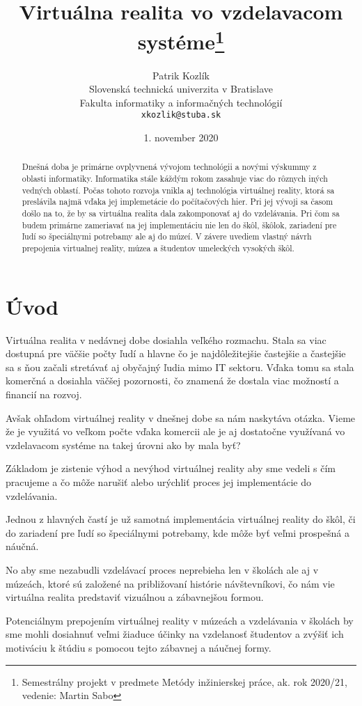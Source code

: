 \documentclass[10pt,twoside,slovak,a4paper]{article}
\title{Virtuálna realita vo vzdelavacom systéme\thanks{Semestrálny projekt v predmete Metódy inžinierskej práce, ak. rok 2020/21, vedenie: Martin Sabo}} %
\author{Patrik Kozlík\\[2pt]
	{\small Slovenská technická univerzita v Bratislave}\\
	{\small Fakulta informatiky a informačných technológií}\\
	{\small \texttt{xkozlik@stuba.sk}}
	}
\date{\small 1. november 2020} %
\begin{document}
\maketitle

\begin{abstract}
Dnešná doba je primárne ovplyvnená vývojom technológii a novými výskummy z oblasti informatiky. Informatika stále káždým rokom zasahuje
viac do rôznych iných vedných oblastí. Počas tohoto rozvoja vnikla aj technológia virtuálnej reality, ktorá sa preslávila najmä vďaka jej
implemetácie do počítačových hier. Pri jej vývoji sa časom došlo na to, že by sa virtuálna realita dala zakomponovať aj do vzdelávania. 
Pri čom sa budem primárne zameriavať na jej implementáciu nie len do škôl, škôlok, zariadení pre ľudí so špeciálnymi potrebamy ale aj do múzeí. V závere uvediem vlastný návrh prepojenia virtualnej reality, múzea a študentov umeleckých vysokých škôl.   	
\end{abstract}



\section{Úvod}

Virtuálna realita v nedávnej dobe dosiahla veľkého rozmachu. Stala sa viac dostupná pre väčšie počty ľudí a hlavne čo je najdôležitejšie 
častejšie a častejšie sa s ňou začali stretávať aj obyčajný ľudia mimo IT sektoru. Vďaka tomu sa stala komerčná a dosiahla väčšej pozornosti,
čo znamená že dostala viac možností a financií na rozvoj. 

Avšak ohľadom virtuálnej reality v dnešnej dobe sa nám naskytáva otázka. Vieme že je využitá vo veľkom počte vďaka komercii ale je aj dostatočne využívaná vo vzdelavacom systéme na takej úrovni ako by mala byť?

Základom je zistenie výhod a nevýhod virtuálnej reality aby sme vedeli s čím pracujeme a čo môže narušiť alebo urýchliť proces 
jej implementácie do vzdelávania.

Jednou z hlavných častí je už samotná implementácia virtuálnej reality do škôl, či do zariadení pre ľudí so špeciálnymi potrebamy,
kde môže byť veľmi prospešná a náučná.

No aby sme nezabudli vzdelávací proces neprebieha len v školách ale aj v múzeách, ktoré sú založené na približovaní histórie návštevníkovi, čo nám vie virtuálna realita predstaviť vizuálnou a zábavnejšou formou.

Potenciálnym prepojením virtuálnej reality v múzeách a vzdelávania v školách by sme mohli dosiahnuť veľmi žiaduce účinky na vzdelanosť študentov a zvýšiť ich motiváciu k štúdiu s pomocou tejto zábavnej a náučnej formy.
\end{document}
